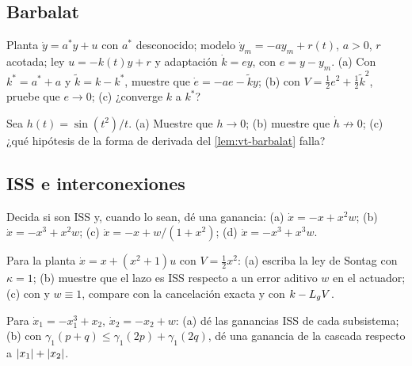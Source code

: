 \subsection*{Barbalat}

\begin{problema}\label{prob:av-mrac}
Planta $\dot y=a^*y+u$ con $a^*$ desconocido; modelo $\dot y_m=-ay_m+r(t)$, $a>0$, $r$ acotada; ley $u=-k(t)y+r$ y adaptación $\dot k=ey$, con $e=y-y_m$. (a) Con $k^*=a^*+a$ y $\tilde k=k-k^*$, muestre que $\dot e=-ae-\tilde ky$; (b) con $V=\tfrac12e^2+\tfrac12\tilde k^2$, pruebe que $e\to0$; (c) ¿converge $k$ a $k^*$?
\end{problema}

\begin{problema}\label{prob:av-sint2}
Sea $h(t)=\sin(t^2)/t$. (a) Muestre que $h\to0$; (b) muestre que $\dot h\not\to0$; (c) ¿qué hipótesis de la forma de derivada del \cref{lem:vt-barbalat} falla?
\end{problema}

\subsection*{ISS e interconexiones}

\begin{problema}[ISS o no]\label{prob:av-issono}
Decida si son ISS y, cuando lo sean, dé una ganancia: (a) $\dot x=-x+x^2w$; (b) $\dot x=-x^3+x^2w$; (c) $\dot x=-x+w/(1+x^2)$; (d) $\dot x=-x^3+x^3w$.
\end{problema}

\begin{problema}\label{prob:av-sontagkappa}
\etiquetaM{} Para la planta $\dot x=x+(x^2+1)u$ con $V=\tfrac12x^2$: (a) escriba la ley de Sontag con $\kappa=1$; (b) muestre que el lazo es ISS respecto a un error aditivo $w$ en el actuador; (c) con  y $w\equiv1$, compare con la cancelación exacta y con $k-L_{g}V$.
\end{problema}

\begin{problema}\label{prob:av-gananciacascada}
Para $\dot x_1=-x_1^3+x_2$, $\dot x_2=-x_2+w$: (a) dé las ganancias ISS de cada subsistema; (b) con $\gamma_1(p+q)\le\gamma_1(2p)+\gamma_1(2q)$, dé una ganancia de la cascada respecto a $\left\lvert x_1\right\rvert+\left\lvert x_2\right\rvert$.
\end{problema}

